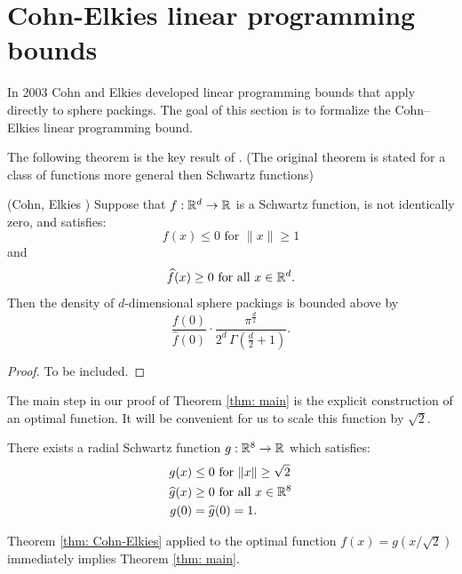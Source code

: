 \section{Cohn-Elkies linear programming bounds}

In 2003 Cohn and Elkies \cite{ElkiesCohn}  developed  linear programming bounds that apply directly to sphere packings. The goal of this section is to formalize the Cohn--Elkies linear programming bound.

The following theorem is the key result of \cite{ElkiesCohn}. (The original theorem is stated for a   class of functions more general then Schwartz functions)
\begin{theorem}\label{thm: Cohn-Elkies}
(Cohn, Elkies \cite{ElkiesCohn}) Suppose that  $f:\mathbb{R}^d\to\mathbb{R}$ is a Schwartz function, is not identically zero, and satisfies:
\begin{equation}\label{eqn: Cohn-Elkies condition 1}f(x)\leq 0\mbox{ for } \|x\|\geq 1\end{equation} and
\begin{equation}\label{eqn: Cohn-Elkies condition 2}\widehat{f}(x)\geq0\mbox{ for all } x\in\mathbb{R}^d.\end{equation}
  Then the  density of  $d$-dimensional
  sphere packings is bounded above by $$\frac{f(0)}{\widehat{f}(0)}\cdot \frac{\pi^{\frac{d}{2}}}{2^d\,\Gamma(\textstyle \frac{d}{2}+1)}.$$
\end{theorem}
\begin{proof}
To be included.
\end{proof}


  The main step in our proof of Theorem \ref{thm: main} is the explicit  construction of an optimal function. It will be convenient for us to scale this function by $\sqrt{2}$.
\begin{theorem}\label{thm: g}
There exists a radial Schwartz function $g:\mathbb{R}^8\to\mathbb{R}$ which satisfies:
\begin{align}
g(x)&\leq 0\mbox{ for } \|x\|\geq \sqrt{2} \label{eqn: g1}\\
\widehat{g}(x)&\geq0\mbox{ for all } x\in\mathbb{R}^8\label{eqn: g2}\\
g(0)&=\widehat{g}(0)=1.\label{eqn: g3}
\end{align}
\end{theorem}
Theorem \ref{thm: Cohn-Elkies} applied to the optimal function $f(x)=g(x/\sqrt{2})$ immediately implies Theorem \ref{thm: main}.


